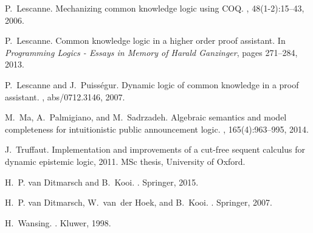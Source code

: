 \documentclass[runningheads,a4paper]{llncs}
\begin{document}
\begin{thebibliography}{10}
P.~Lescanne.
\newblock Mechanizing common knowledge logic using {COQ}.
, 48(1-2):15--43, 2006.

P.~Lescanne.
\newblock Common knowledge logic in a higher order proof assistant.
\newblock In {\em Programming Logics - Essays in Memory of Harald Ganzinger},
  pages 271--284, 2013.

P.~Lescanne and J.~Puiss{\'{e}}gur.
\newblock Dynamic logic of common knowledge in a proof assistant.
, abs/0712.3146, 2007.

M.~Ma, A.~Palmigiano, and M.~Sadrzadeh.
\newblock Algebraic semantics and model completeness for intuitionistic public
  announcement logic.
, 165(4):963--995, 2014.

J.~Truffaut.
\newblock Implementation and improvements of a cut-free sequent calculus for
  dynamic epistemic logic, 2011.
\newblock MSc thesis, University of Oxford.

H.~P. van Ditmarsch and B.~Kooi.
.
\newblock Springer, 2015.

H.~P. van Ditmarsch, W.~van~der Hoek, and B.~Kooi.
.
\newblock Springer, 2007.

H.~Wansing.
.
\newblock Kluwer, 1998.

\end{thebibliography}

\appendix
\end{document}
